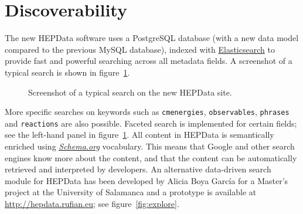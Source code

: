 \documentclass[a4paper]{jpconf}
\begin{document}
\section{Discoverability}

The new HEPData software uses a PostgreSQL database (with a new data model
compared to the previous MySQL database), indexed with
\href{https://www.elastic.co}{Elasticsearch} to provide fast and powerful
searching across all metadata fields.  A screenshot of a typical search is
shown in figure~\ref{fig:search}.
%
\begin{figure}
  \begin{center}
  \end{center}
  \caption{\label{fig:search}Screenshot of a typical search on the new HEPData
site.}
\end{figure}
%
More specific searches on keywords such as \verb+cmenergies+,
\verb+observables+, \verb+phrases+ and \verb+reactions+ are also possible.
 Faceted search is implemented for certain fields; see the left-hand panel in
figure~\ref{fig:search}.  All content in HEPData is semantically enriched using
\href{https://schema.org/}{\emph{Schema.org}} vocabulary.  This means that
Google and other search engines know more about the content, and that the
content can be automatically retrieved and interpreted by developers.  An
alternative data-driven search module for HEPData has been developed by Alicia
Boya Garc\'{i}a for a Master's project at the University of Salamanca and a
prototype is available at \url{http://hepdata.rufian.eu}; see
figure~\ref{fig:explore}.
%
\end{document}
